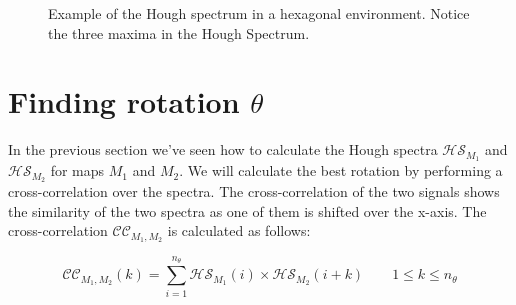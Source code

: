 \begin{figure}[ht]
\centering
{}
\caption{Example of the Hough spectrum in a hexagonal environment. Notice the three maxima in the Hough Spectrum.}
\label{fig:beehive}
\end{figure}

\section{Finding rotation $\theta$}
In the previous section we've seen how to calculate the Hough spectra $\mathcal{HS}_{M_1}$ and $\mathcal{HS}_{M_2}$ for maps $M_1$ and $M_2$. We will calculate the best rotation by performing a cross-correlation over the spectra. The cross-correlation of the two signals shows the similarity of the two spectra as one of them is shifted over the x-axis. The cross-correlation $\mathcal{CC}_{M_1,M_2}$ is calculated as follows:

\begin{equation}
\mathcal{CC}_{M_1,M_2}(k) = \sum_{i=1}^{n_\theta} \mathcal{HS}_{M_1}(i) \times \mathcal{HS}_{M_2}(i + k) \qquad 1 \leq k \leq n_\theta
\end{equation}

